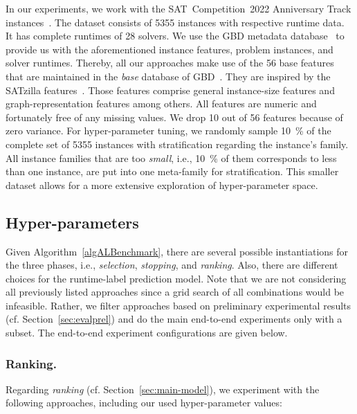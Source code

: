 \documentclass[runningheads]{llncs}
\begin{document}
In our experiments, we work with the SAT~Competition~2022 Anniversary Track instances~\cite{sat2022}.
The dataset consists of 5355 instances with respective runtime data.
It has complete runtimes of 28 solvers.
We use the GBD metadata database~\cite{IserS18} to provide us with the aforementioned instance features, problem instances, and solver runtimes.
Thereby, all our approaches make use of the 56 base features that are maintained in the \emph{base} database of GBD~\cite{IserS18}.
They are inspired by the SATzilla features~\cite{features}.
Those features comprise general instance-size features and graph-representation features among others.
All features are numeric and fortunately free of any missing values.
We drop 10 out of 56 features because of zero variance.
For hyper-parameter tuning, we randomly sample \SI{10}{\%} of the complete set of 5355 instances with stratification regarding the instance's family.
All instance families that are too \emph{small}, i.e., \SI{10}{\%} of them corresponds to less than one instance, are put into one meta-family for stratification.
This smaller dataset allows for a more extensive exploration of hyper-parameter space.

\subsection{Hyper-parameters}
\label{sec:hyper}

Given Algorithm~\ref{algALBenchmark}, there are several possible instantiations for the three phases, i.e., \emph{selection}, \emph{stopping}, and \emph{ranking}.
Also, there are different choices for the runtime-label prediction model.
Note that we are not considering all previously listed approaches since a grid search of all combinations would be infeasible.
Rather, we filter approaches based on preliminary experimental results (cf. Section~\ref{sec:evalprel}) and do the main end-to-end experiments only with a subset.
The end-to-end experiment configurations are given below.

\subsubsection{Ranking.}

Regarding \emph{ranking} (cf. Section~\ref{sec:main-model}), we experiment with the following approaches, including our used hyper-parameter values:
\end{document}
